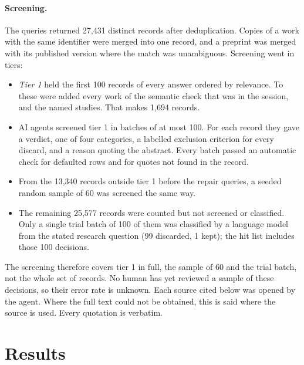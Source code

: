\paragraph{Screening.}
The queries returned 27,431 distinct records after deduplication. Copies
of a work with the same identifier were merged into one record, and a
preprint was merged with its published version where the match was
unambiguous. Screening went in tiers:
\begin{itemize}
\item \emph{Tier 1} held the first 100 records of every answer ordered by
  relevance. To these were added every work of the semantic check that
  was in the session, and the named studies. That makes 1,694 records.
\item AI agents screened tier 1 in batches of at most 100. For each
  record they gave a verdict, one of four categories, a labelled
  exclusion criterion for every discard, and a reason quoting the
  abstract. Every batch passed an automatic check for defaulted rows and
  for quotes not found in the record.
\item From the 13,340 records outside tier 1 before the repair queries,
  a seeded random sample of 60 was screened the same way.
\item The remaining 25,577 records were counted but not screened or
  classified. Only a single trial batch of 100 of them was
  classified by a language model from the stated research question
  (99 discarded, 1 kept); the hit list includes those 100 decisions.
\end{itemize}
The screening therefore covers tier 1 in full, the sample of 60 and the
trial batch, not the whole set of records. No human has yet reviewed a
sample of these decisions, so their error rate is unknown. Each source
cited below was opened by the agent. Where the full text could not be
obtained, this is said where the source is used. Every quotation is
verbatim.

\section{Results}
\label{who-gains:results}

